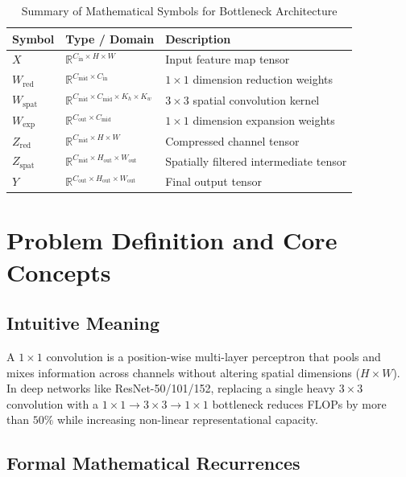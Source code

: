 \documentclass[11pt,a4paper]{article}
\theoremstyle{definition}
\begin{document}
\begin{table}[h]
\centering
\caption{Summary of Mathematical Symbols for Bottleneck Architecture}
\begin{tabular}{lll}
\toprule
\textbf{Symbol} & \textbf{Type / Domain} & \textbf{Description} \\
\midrule
$X$ & $\mathbb{R}^{C_{\text{in}} \times H \times W}$ & Input feature map tensor \\
$W_{\text{red}}$ & $\mathbb{R}^{C_{\text{mid}} \times C_{\text{in}}}$ & $1 \times 1$ dimension reduction weights \\
$W_{\text{spat}}$ & $\mathbb{R}^{C_{\text{mid}} \times C_{\text{mid}} \times K_h \times K_w}$ & $3 \times 3$ spatial convolution kernel \\
$W_{\text{exp}}$ & $\mathbb{R}^{C_{\text{out}} \times C_{\text{mid}}}$ & $1 \times 1$ dimension expansion weights \\
$Z_{\text{red}}$ & $\mathbb{R}^{C_{\text{mid}} \times H \times W}$ & Compressed channel tensor \\
$Z_{\text{spat}}$ & $\mathbb{R}^{C_{\text{mid}} \times H_{\text{out}} \times W_{\text{out}}}$ & Spatially filtered intermediate tensor \\
$Y$ & $\mathbb{R}^{C_{\text{out}} \times H_{\text{out}} \times W_{\text{out}}}$ & Final output tensor \\
\bottomrule
\end{tabular}
\end{table}

\section{Problem Definition and Core Concepts}

\subsection{Intuitive Meaning}
A $1 \times 1$ convolution is a position-wise multi-layer perceptron that pools and mixes information across channels without altering spatial dimensions ($H \times W$). In deep networks like ResNet-50/101/152, replacing a single heavy $3 \times 3$ convolution with a $1 \times 1 \to 3 \times 3 \to 1 \times 1$ bottleneck reduces FLOPs by more than $50\%$ while increasing non-linear representational capacity.

\subsection{Formal Mathematical Recurrences}
\end{document}
